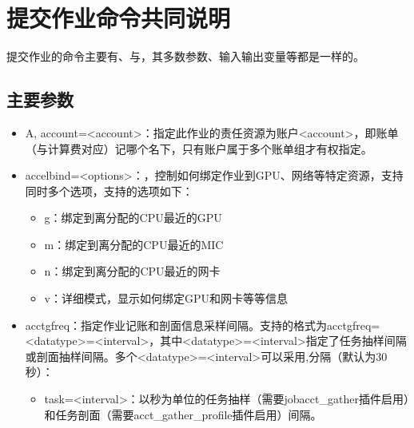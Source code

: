 \documentclass[a4paper,12pt,english]{sphinxmanual}
\begin{document}
\section{提交作业命令共同说明}
\label{\detokenize{slurm/slurm:id19}}
\sphinxAtStartPar
提交作业的命令主要有、与，其多数参数、输入输出变量等都是一样的。


\subsection{主要参数}
\label{\detokenize{slurm/slurm:slurmoption}}\label{\detokenize{slurm/slurm:id20}}\begin{itemize}
\item {} 
\sphinxAtStartPar
\sphinxhyphen{}A, \sphinxhyphen{}\sphinxhyphen{}account=<account>：指定此作业的责任资源为账户<account>，即账单（与计算费对应）记哪个名下，只有账户属于多个账单组才有权指定。

\item {} 
\sphinxAtStartPar
\sphinxhyphen{}\sphinxhyphen{}accel\sphinxhyphen{}bind=<options>：，控制如何绑定作业到GPU、网络等特定资源，支持同时多个选项，支持的选项如下：
\begin{itemize}
\item {} 
\sphinxAtStartPar
g：绑定到离分配的CPU最近的GPU

\item {} 
\sphinxAtStartPar
m：绑定到离分配的CPU最近的MIC

\item {} 
\sphinxAtStartPar
n：绑定到离分配的CPU最近的网卡

\item {} 
\sphinxAtStartPar
v：详细模式，显示如何绑定GPU和网卡等等信息

\end{itemize}

\item {} 
\sphinxAtStartPar
\sphinxhyphen{}\sphinxhyphen{}acctg\sphinxhyphen{}freq：指定作业记账和剖面信息采样间隔。支持的格式为\sphinxhyphen{}\sphinxhyphen{}acctg\sphinxhyphen{}freq=<datatype>=<interval>，其中<datatype>=<interval>指定了任务抽样间隔或剖面抽样间隔。多个<datatype>=<interval>可以采用,分隔（默认为30秒）：
\begin{itemize}
\item {} 
\sphinxAtStartPar
task=<interval>：以秒为单位的任务抽样（需要jobacct\_gather插件启用）和任务剖面（需要acct\_gather\_profile插件启用）间隔。


\end{itemize}
\end{itemize}
\end{document}
